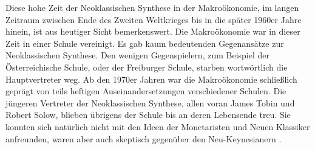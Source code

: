 Diese hohe Zeit der Neoklassischen Synthese in der Makroökonomie, im langen Zeitraum zwischen Ende des Zweiten Weltkrieges bis in die später 1960er Jahre hinein, ist aus heutiger Sicht bemerkenswert. Die Makroökonomie war in dieser Zeit in einer Schule vereinigt. Es gab kaum bedeutenden Gegenansätze zur Neoklassischen Synthese. Den wenigen Gegenspielern, zum Beispiel der Österreichische Schule, oder der Freiburger Schule, starben wortwörtlich die Hauptvertreter weg. Ab den 1970er Jahren war die Makroökonomie schließlich geprägt von teils heftigen Auseinandersetzungen verschiedener Schulen. Die jüngeren Vertreter der Neoklassischen Synthese, allen voran James Tobin und Robert Solow, blieben übrigens der Schule bis an deren Lebensende treu. Sie konnten sich natürlich nicht mit den Ideen der Monetaristen und Neuen Klassiker anfreunden, waren aber auch skeptisch gegenüber den Neu-Keynesianern \parencite[S. 148]{Snowdon2005}.